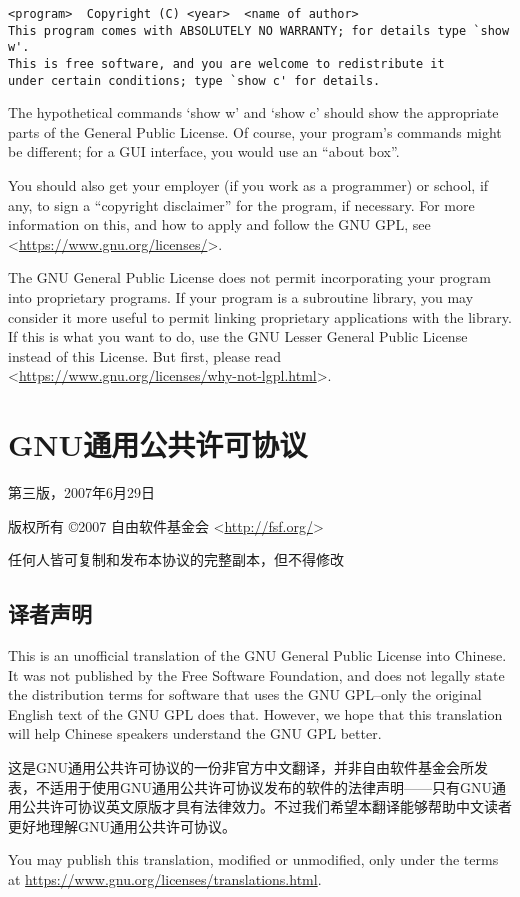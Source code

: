 \begin{verbatim}
<program>  Copyright (C) <year>  <name of author>
This program comes with ABSOLUTELY NO WARRANTY; for details type `show w'.
This is free software, and you are welcome to redistribute it
under certain conditions; type `show c' for details.
\end{verbatim}\par
The hypothetical commands `show w' and `show c' should show the appropriate parts of the General Public License. Of course, your program's commands might be different; for a GUI interface, you would use an “about box”.\par
You should also get your employer (if you work as a programmer) or school, if any, to sign a “copyright disclaimer” for the program, if necessary. For more information on this, and how to apply and follow the GNU GPL, see <\url{https://www.gnu.org/licenses/}>.\par
The GNU General Public License does not permit incorporating your program into proprietary programs. If your program is a subroutine library, you may consider it more useful to permit linking proprietary applications with the library. If this is what you want to do, use the GNU Lesser General Public License instead of this License. But first, please read <\url{https://www.gnu.org/licenses/why-not-lgpl.html}>.
\chapter{GNU通用公共许可协议}
第三版，2007年6月29日\par
版权所有 \copyright 2007 自由软件基金会 <\url{http://fsf.org/}>\par
任何人皆可复制和发布本协议的完整副本，但不得修改\par
\section{译者声明}
This is an unofficial translation of the GNU General Public License into Chinese. It was not published by the Free Software Foundation, and does not legally state the distribution terms for software that uses the GNU GPL--only the original English text of the GNU GPL does that. However, we hope that this translation will help Chinese speakers understand the GNU GPL better.\par
这是GNU通用公共许可协议的一份非官方中文翻译，并非自由软件基金会所发表，不适用于使用GNU通用公共许可协议发布的软件的法律声明——只有GNU通用公共许可协议英文原版才具有法律效力。不过我们希望本翻译能够帮助中文读者更好地理解GNU通用公共许可协议。\par
You may publish this translation, modified or unmodified, only under the terms at \url{https://www.gnu.org/licenses/translations.html}.\par
